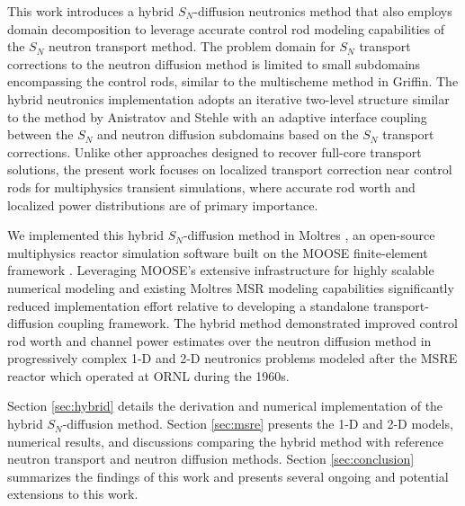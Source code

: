 This work introduces a hybrid $S_N$-diffusion neutronics method that also employs domain
decomposition to leverage accurate control rod modeling capabilities of the $S_N$ neutron transport
method. The problem domain for $S_N$ transport corrections to the neutron diffusion method is
limited to small subdomains encompassing the control rods, similar to the multischeme method in
Griffin. The hybrid neutronics implementation adopts an iterative two-level structure similar to
the method by Anistratov and Stehle with an adaptive interface coupling between the $S_N$ and
neutron diffusion subdomains based on the $S_N$ transport corrections.
Unlike other approaches designed to recover full-core transport solutions, the
present work focuses on localized transport correction near control rods for multiphysics transient
simulations, where accurate rod worth and localized power distributions are of primary importance.

We implemented this hybrid $S_N$-diffusion method in Moltres \cite{lindsay_introduction_2018,
park_verification_2022}, an open-source multiphysics reactor simulation software built on the
\gls{MOOSE} finite-element framework \cite{giudicelli30MOOSEEnabling2024}.
Leveraging \gls{MOOSE}'s extensive infrastructure for highly scalable numerical modeling and
existing Moltres \gls{MSR} modeling capabilities significantly reduced implementation effort
relative to developing a standalone transport-diffusion coupling framework. The hybrid method
demonstrated improved control rod worth and channel power estimates over the neutron diffusion
method in progressively complex 1-D and 2-D neutronics problems
modeled after the \gls{MSRE} reactor which operated at \gls{ORNL} during the 1960s.

Section \ref{sec:hybrid} details the derivation and
numerical implementation of the hybrid $S_N$-diffusion method. Section \ref{sec:msre} presents the
1-D and 2-D models, numerical results, and discussions comparing the hybrid method with reference
neutron transport and neutron diffusion methods. Section
\ref{sec:conclusion} summarizes the findings of this work and presents several ongoing and
potential extensions to this work.
